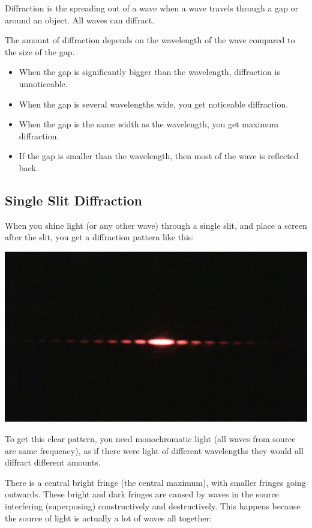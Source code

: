 \documentclass[a4paper, 12pt]{article}
\begin{document}
Diffraction is the spreading out of a wave when a wave travels through a gap or around an object.
All waves can diffract.

The amount of diffraction depends on the wavelength of the wave compared to the size of the gap.

\begin{itemize}
	\item{When the gap is significantly bigger than the wavelength, diffraction is unnoticeable.}
	\item{When the gap is several wavelengths wide, you get noticeable diffraction.}
	\item{When the gap is the same width as the wavelength, you get maximum diffraction.}
	\item{If the gap is smaller than the wavelength, then most of the wave is reflected back.}
\end{itemize}

\subsection{Single Slit Diffraction}

When you shine light (or any other wave) through a single slit, and place a screen after the slit, you get a diffraction pattern like this:

\includegraphics[width=\textwidth]{images/singleSlitDiffPattern.jpg}

To get this clear pattern, you need monochromatic light (all waves from source are same frequency), as if there were light of different wavelengths they would all diffract different amounts.

There is a central bright fringe (the central maximum), with smaller fringes going outwards. These bright and dark fringes are caused by waves in the source interfering (superposing) constructively and destructively. This happens because the source of light is actually a lot of waves all together:
\end{document}
